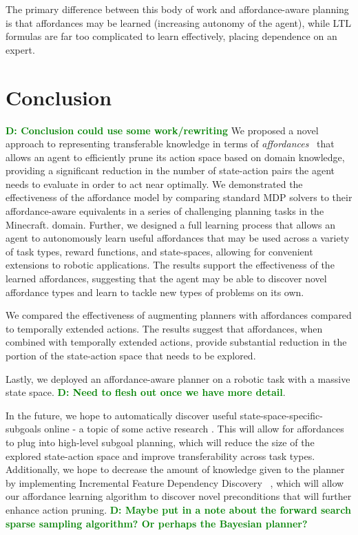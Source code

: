 \documentclass[conference]{IEEEtran}
\newcommand{\dnote}[1]{\textcolor{Green}{\textbf{D: #1}}}
\begin{document}
The primary difference between this body of work and affordance-aware planning is that affordances may be learned (increasing autonomy of the agent), while LTL formulas are far too complicated to learn effectively, placing dependence on an expert.

\section{Conclusion}
\label{sec:conclusion}
\dnote{Conclusion could use some work/rewriting}
We proposed a novel approach to representing transferable knowledge in terms of
{\em affordances}~\cite{gibson77} that allows an agent to efficiently
prune its action space based on domain knowledge,
providing a significant reduction in the number of state-action pairs the
agent needs to evaluate in order to act near optimally. We demonstrated the effectiveness of the affordance model by comparing standard MDP solvers
to their affordance-aware equivalents in a series of challenging planning tasks in the Minecraft.
domain. Further, we designed a full learning process that allows an agent to autonomously learn useful affordances that may be used
across a variety of task types, reward functions, and state-spaces, allowing for convenient extensions to robotic applications.
The results support the effectiveness of the learned affordances, suggesting that the agent may be able to discover novel affordance types and learn to tackle new types of problems on its own.

We compared the effectiveness of augmenting planners with affordances compared to temporally extended actions. The results suggest that affordances, when combined with temporally extended actions, provide substantial reduction in the portion of the state-action space that needs to be explored.

Lastly, we deployed an affordance-aware planner on a robotic task with a massive state space. \dnote{Need to flesh out once we have more detail}.

In the future, we hope to automatically discover useful state-space-specific-subgoals online - a topic of some active research \cite{Mcgovern01automaticdiscovery,Simsek:2005:IUS:1102351.1102454}. This will allow for affordances to plug into high-level subgoal planning, which will reduce the size of the explored state-action space and improve transferability across task types. Additionally, we hope to decrease the amount of knowledge given to the planner by implementing Incremental Feature Dependency Discovery ~\cite{ICML2011Geramifard_473}, which will allow our affordance learning algorithm to discover novel preconditions that will further enhance action pruning. \dnote{Maybe put in a note about the forward search sparse sampling algorithm? Or perhaps the Bayesian planner?}

{\small


}
\end{document}
